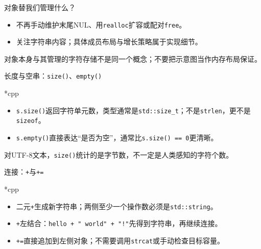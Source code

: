 \begin{frame}{对象替我们管理什么？}
\begin{center}
\end{center}
\begin{itemize}
\item 不再手动维护末尾NUL、用\texttt{realloc}扩容或配对\texttt{free}。
\item 关注字符串内容；具体成员布局与增长策略属于实现细节。
\end{itemize}
\medskip
\alert{对象本身与其管理的字符存储不是同一个概念；不要把示意图当作内存布局保证。}
\end{frame}

\begin{frame}{长度与空串：\texttt{size()}、\texttt{empty()}}
\begin{Code}*{cpp}\end{Code}
\begin{itemize}
\item \texttt{s.size()}返回字符单元数，类型通常是\texttt{std::size\_t}；不是\texttt{strlen}，更不是\texttt{sizeof}。
\item \texttt{s.empty()}直接表达“是否为空”，通常比\texttt{s.size() == 0}更清晰。
\end{itemize}
\medskip
\small 对UTF-8文本，\texttt{size()}统计的是字节数，不一定是人类感知的字符个数。
\end{frame}

\begin{frame}{连接：\texttt{+}与\texttt{+=}}
\begin{Code}*{cpp}\end{Code}
\begin{itemize}
\item 二元\texttt{+}生成新字符串；两侧至少一个操作数必须是\texttt{std::string}。
\item \texttt{+}左结合：\texttt{hello + " world" + "!"}先得到字符串，再继续连接。
\item \texttt{+=}直接追加到左侧对象；不需要调用\texttt{strcat}或手动检查目标容量。
\end{itemize}
\end{frame}

